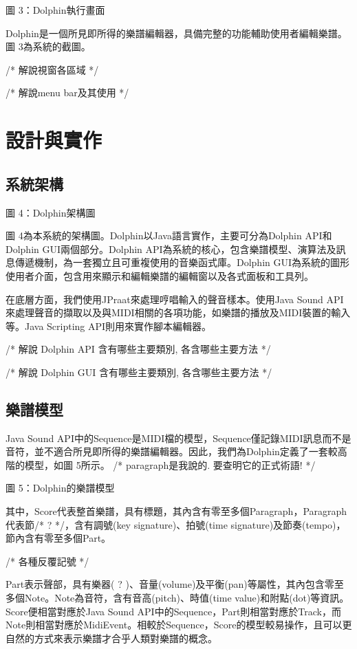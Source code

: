 \documentclass[12pt,a4paper,oneside]{report}
\begin{document}
 
圖 3：Dolphin執行畫面

Dolphin是一個所見即所得的樂譜編輯器，具備完整的功能輔助使用者編輯樂譜。圖 3為系統的截圖。

/* 
解說視窗各區域
*/

/* 
解說menu bar及其使用
*/


\chapter{設計與實作}

\section{系統架構}


圖 4：Dolphin架構圖

圖 4為本系統的架構圖。Dolphin以Java語言實作，主要可分為Dolphin API和Dolphin GUI兩個部分。Dolphin API為系統的核心，包含樂譜模型、演算法及訊息傳遞機制，為一套獨立且可重複使用的音樂函式庫。Dolphin GUI為系統的圖形使用者介面，包含用來顯示和編輯樂譜的編輯窗以及各式面板和工具列。

在底層方面，我們使用JPraat來處理哼唱輸入的聲音樣本。使用Java Sound API來處理聲音的擷取以及與MIDI相關的各項功能，如樂譜的播放及MIDI裝置的輸入等。Java Scripting API則用來實作腳本編輯器。


/* 
解說 Dolphin API 含有哪些主要類別, 各含哪些主要方法
*/

/* 
解說 Dolphin GUI 含有哪些主要類別, 各含哪些主要方法
*/



\section{樂譜模型}

Java Sound API中的Sequence是MIDI檔的模型，Sequence僅記錄MIDI訊息而不是音符，並不適合所見即所得的樂譜編輯器。因此，我們為Dolphin定義了一套較高階的模型，如圖 5所示。 /* paragraph是我說的. 要查明它的正式術語! */



圖 5：Dolphin的樂譜模型

其中，Score代表整首樂譜，具有標題，其內含有零至多個Paragraph，Paragraph代表節/* ? */，含有調號(key signature)、拍號(time signature)及節奏(tempo)，節內含有零至多個Part。

/* 各種反覆記號  */ 

Part表示聲部，具有樂器( ? )、音量(volume)及平衡(pan)等屬性，其內包含零至多個Note。Note為音符，含有音高(pitch)、時值(time value)和附點(dot)等資訊。Score便相當對應於Java Sound API中的Sequence，Part則相當對應於Track，而Note則相當對應於MidiEvent。相較於Sequence，Score的模型較易操作，且可以更自然的方式來表示樂譜才合乎人類對樂譜的概念。
\end{document}
